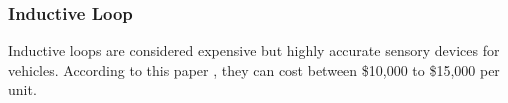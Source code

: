 \subsubsection*{Inductive Loop}
Inductive loops are considered expensive but highly accurate sensory devices for vehicles. According to this paper \citep{dokur_embedded_2016}, they can cost between \$10,000 to \$15,000 per unit. 